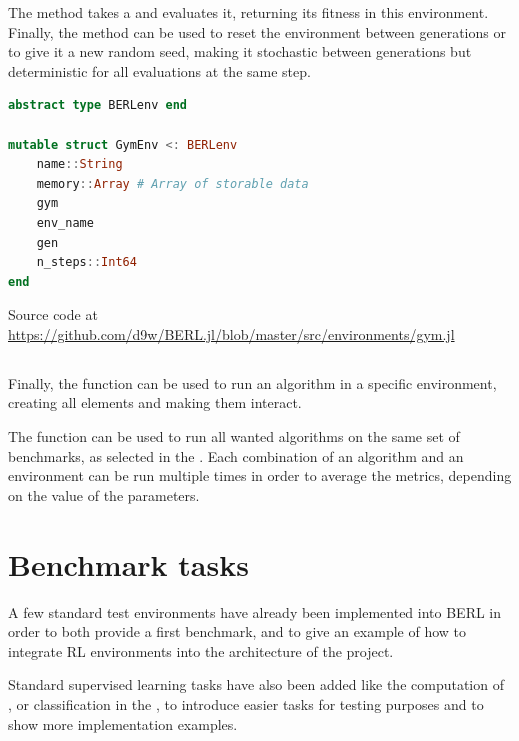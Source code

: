 The  method takes a  and evaluates it, returning its fitness in this environment. Finally, the  method can be used to reset the environment between generations or to give it a new random seed, making it stochastic between generations but deterministic for all evaluations at the same step.

\begin{minipage}{\linewidth}
\begin{lstlisting}[language=Julia, caption=Gym wrapper in BERL]
abstract type BERLenv end

mutable struct GymEnv <: BERLenv
    name::String
    memory::Array # Array of storable data
    gym
    env_name
    gen
    n_steps::Int64
end
\end{lstlisting}
Source code at \url{https://github.com/d9w/BERL.jl/blob/master/src/environments/gym.jl}\\
\end{minipage}


\subsection{}

Finally, the  function can be used to run an algorithm in a specific environment, creating all elements and making them interact. 

The  function can be used to run all wanted algorithms on the same set of benchmarks, as selected in the . Each combination of an algorithm and an environment can be run multiple times in order to average the metrics, depending on the value of the  parameters.

\section{Benchmark tasks}
A few standard test environments have already been implemented into BERL in order to both provide a first benchmark, and to give an example of how to integrate RL environments into the architecture of the project. 

Standard supervised learning tasks have also been added like the computation of , or classification in the , to introduce easier tasks for testing purposes and to show more implementation examples.

